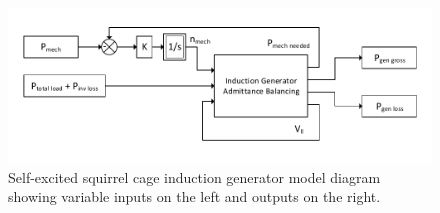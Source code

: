\begin{figure}[h]
	\centering

	\includegraphics[width=\textwidth]{figures/SCIGBlock.pdf} 

	\caption{Self-excited squirrel cage induction generator model diagram showing variable inputs on the left and outputs on the right.}
	\label{fig:scigblock_label}

\end{figure}